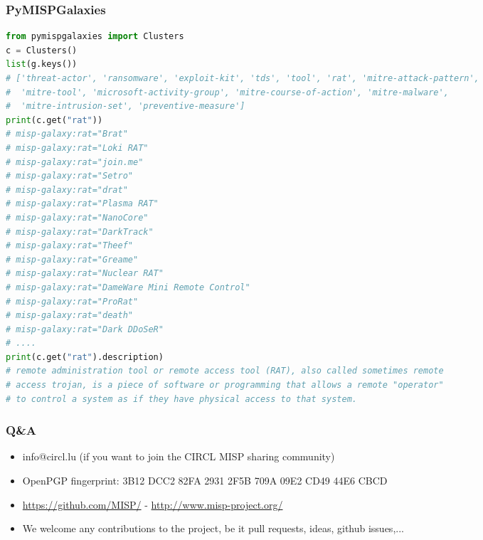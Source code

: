 \begin{frame}[fragile]
\frametitle{PyMISPGalaxies}
        \begin{adjustbox}{keepaspectratio}
\begin{lstlisting}[language=Python,basicstyle=\tiny]
from pymispgalaxies import Clusters
c = Clusters()
list(g.keys())
# ['threat-actor', 'ransomware', 'exploit-kit', 'tds', 'tool', 'rat', 'mitre-attack-pattern',
#  'mitre-tool', 'microsoft-activity-group', 'mitre-course-of-action', 'mitre-malware',
#  'mitre-intrusion-set', 'preventive-measure']
print(c.get("rat"))
# misp-galaxy:rat="Brat"
# misp-galaxy:rat="Loki RAT"
# misp-galaxy:rat="join.me"
# misp-galaxy:rat="Setro"
# misp-galaxy:rat="drat"
# misp-galaxy:rat="Plasma RAT"
# misp-galaxy:rat="NanoCore"
# misp-galaxy:rat="DarkTrack"
# misp-galaxy:rat="Theef"
# misp-galaxy:rat="Greame"
# misp-galaxy:rat="Nuclear RAT"
# misp-galaxy:rat="DameWare Mini Remote Control"
# misp-galaxy:rat="ProRat"
# misp-galaxy:rat="death"
# misp-galaxy:rat="Dark DDoSeR"
# ....
print(c.get("rat").description)
# remote administration tool or remote access tool (RAT), also called sometimes remote
# access trojan, is a piece of software or programming that allows a remote "operator"
# to control a system as if they have physical access to that system.
\end{lstlisting}
                \end{adjustbox}
\end{frame}


\begin{frame}
        \frametitle{Q\&A}
        \begin{itemize}
                \item info@circl.lu (if you want to join the CIRCL MISP sharing community)
                \item OpenPGP fingerprint: 3B12 DCC2 82FA 2931 2F5B 709A 09E2 CD49 44E6 CBCD
                \item \url{https://github.com/MISP/} - \url{http://www.misp-project.org/}
                \item We welcome any contributions to the project, be it pull requests, ideas, github issues,...
        \end{itemize}
\end{frame}

